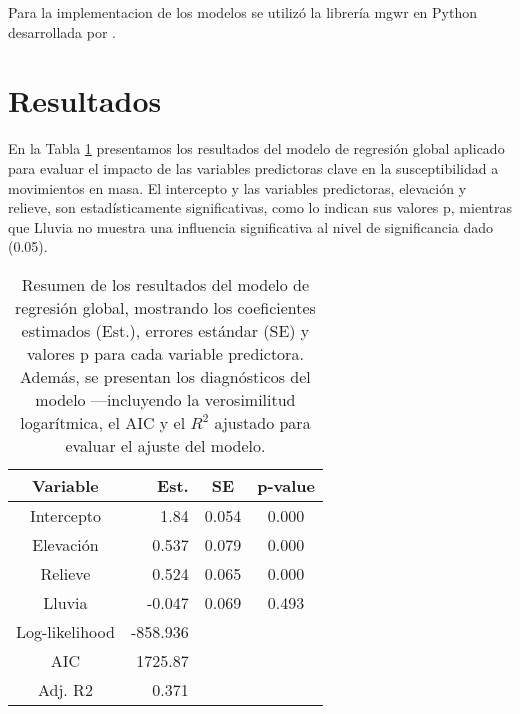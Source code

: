 \documentclass[
  manuscript=article,  
  layout=preprint,  
]{format}
\begin{document}
\par Para la implementacion de los modelos se utilizó la librería mgwr en Python desarrollada por \cite{oshan2019mgwr}.

\section{Resultados}

En la Tabla \ref{tab:comparison_results} presentamos los resultados del modelo de regresión global aplicado para evaluar el impacto de las variables predictoras clave en la susceptibilidad a movimientos en masa. El intercepto y las variables predictoras, elevación y relieve, son estadísticamente significativas, como lo indican sus valores p, mientras que Lluvia no muestra una influencia significativa al nivel de significancia dado (0.05).

\begin{table}
\caption{Resumen de los resultados del modelo de regresión global, mostrando los coeficientes estimados (Est.), errores estándar (SE) y valores p para cada variable predictora. Además, se presentan los diagnósticos del modelo —incluyendo la verosimilitud logarítmica, el AIC y el $R^2$ ajustado para evaluar el ajuste del modelo.}
\label{tab:comparison_results}
\begin{tabular}{crcc}
\hline
    Variable    &     Est. &  SE   &  p-value  \\
\hline
   Intercepto   &    1.84  & 0.054 &   0.000   \\
   Elevación    &    0.537 & 0.079 &   0.000   \\
    Relieve     &    0.524 & 0.065 &   0.000   \\
     Lluvia     &   -0.047 & 0.069 &   0.493   \\
\hline
 Log-likelihood & -858.936 &       &           \\
      AIC       & 1725.87  &       &           \\
    Adj. R2     &    0.371 &       &           \\
\hline
\end{tabular}
\end{table}
\end{document}
